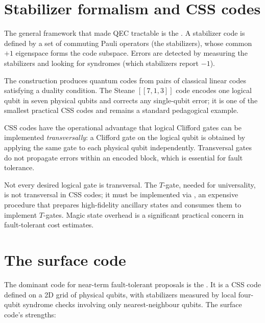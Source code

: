 \section{Stabilizer formalism and CSS codes}

The general framework that made QEC tractable is the . A stabilizer code is defined by a set of commuting Pauli operators (the stabilizers), whose common $+1$ eigenspace forms the code subspace. Errors are detected by measuring the stabilizers and looking for syndromes (which stabilizers report $-1$).

The  construction \citep{calderbank_good_1996,steane_error_1996} produces quantum codes from pairs of classical linear codes satisfying a duality condition. The Steane $[[7,1,3]]$ code encodes one logical qubit in seven physical qubits and corrects any single-qubit error; it is one of the smallest practical CSS codes and remains a standard pedagogical example.

CSS codes have the operational advantage that logical Clifford gates can be implemented \emph{transversally}: a Clifford gate on the logical qubit is obtained by applying the same gate to each physical qubit independently. Transversal gates do not propagate errors within an encoded block, which is essential for fault tolerance.

\begin{remark}
Not every desired logical gate is transversal. The $T$-gate, needed for universality, is not transversal in CSS codes; it must be implemented via , an expensive procedure that prepares high-fidelity ancillary states and consumes them to implement $T$-gates. Magic state overhead is a significant practical concern in fault-tolerant cost estimates.
\end{remark}

\section{The surface code}

The dominant code for near-term fault-tolerant proposals is the  \citep{kitaev_fault-tolerant_2003,fowler_surface_2012}. It is a CSS code defined on a 2D grid of physical qubits, with stabilizers measured by local four-qubit syndrome checks involving only nearest-neighbour qubits. The surface code's strengths:

